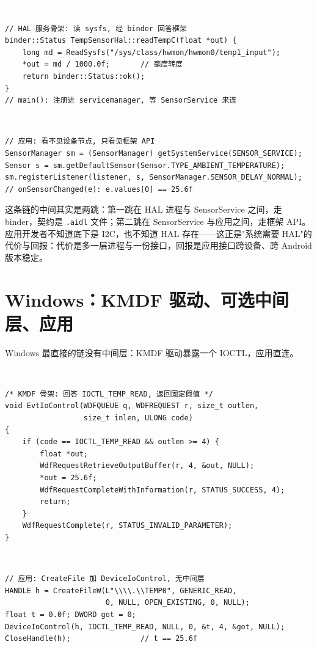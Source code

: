\documentclass[12pt,a4paper,fontset=fandol]{ctexbook}
\newcommand{\clabel}{%
  \begin{tcolorbox}[enhanced,colback=cheadbg,colframe=cheadbg,
    arc=1mm,boxrule=0mm,left=6pt,right=6pt,top=2pt,bottom=2pt,
    halign=left,oversize]
    \textcolor{white}{\small\bfseries C}
  \end{tcolorbox}\vspace{-4pt}}
\newcommand{\cpplabel}{%
  \begin{tcolorbox}[enhanced,colback=cppheadbg,colframe=cppheadbg,
    arc=1mm,boxrule=0mm,left=6pt,right=6pt,top=2pt,bottom=2pt,
    halign=left,oversize]
    \textcolor{white}{\small\bfseries C++}
  \end{tcolorbox}\vspace{-4pt}}
\newcommand{\javalabel}{%
  \begin{tcolorbox}[enhanced,colback=javaheadbg,colframe=javaheadbg,
    arc=1mm,boxrule=0mm,left=6pt,right=6pt,top=2pt,bottom=2pt,
    halign=left,oversize]
    \textcolor{white}{\small\bfseries Java}
  \end{tcolorbox}\vspace{-4pt}}
\begin{document}
\cpplabel
\begin{lstlisting}[style=cppstyle]
// HAL 服务骨架: 读 sysfs, 经 binder 回答框架
binder::Status TempSensorHal::readTempC(float *out) {
    long md = ReadSysfs("/sys/class/hwmon/hwmon0/temp1_input");
    *out = md / 1000.0f;       // 毫度转度
    return binder::Status::ok();
}
// main(): 注册进 servicemanager, 等 SensorService 来连
\end{lstlisting}

\javalabel
\begin{lstlisting}[style=javastyle]
// 应用: 看不见设备节点, 只看见框架 API
SensorManager sm = (SensorManager) getSystemService(SENSOR_SERVICE);
Sensor s = sm.getDefaultSensor(Sensor.TYPE_AMBIENT_TEMPERATURE);
sm.registerListener(listener, s, SensorManager.SENSOR_DELAY_NORMAL);
// onSensorChanged(e): e.values[0] == 25.6f
\end{lstlisting}

这条链的中间其实是两跳：第一跳在 HAL 进程与 SensorService 之间，走 binder，契约是 \texttt{.aidl} 文件；第二跳在 SensorService 与应用之间，走框架 API。应用开发者不知道底下是 I2C，也不知道 HAL 存在——这正是"系统需要 HAL"的代价与回报：代价是多一层进程与一份接口，回报是应用接口跨设备、跨 Android 版本稳定。

\section{Windows：KMDF 驱动、可选中间层、应用}

Windows 最直接的链没有中间层：KMDF 驱动暴露一个 IOCTL，应用直连。

\clabel
\begin{lstlisting}[style=cstyle]
/* KMDF 骨架: 回答 IOCTL_TEMP_READ, 返回固定假值 */
void EvtIoControl(WDFQUEUE q, WDFREQUEST r, size_t outlen,
                  size_t inlen, ULONG code)
{
    if (code == IOCTL_TEMP_READ && outlen >= 4) {
        float *out;
        WdfRequestRetrieveOutputBuffer(r, 4, &out, NULL);
        *out = 25.6f;
        WdfRequestCompleteWithInformation(r, STATUS_SUCCESS, 4);
        return;
    }
    WdfRequestComplete(r, STATUS_INVALID_PARAMETER);
}
\end{lstlisting}

\cpplabel
\begin{lstlisting}[style=cppstyle]
// 应用: CreateFile 加 DeviceIoControl, 无中间层
HANDLE h = CreateFileW(L"\\\\.\\TEMP0", GENERIC_READ,
                       0, NULL, OPEN_EXISTING, 0, NULL);
float t = 0.0f; DWORD got = 0;
DeviceIoControl(h, IOCTL_TEMP_READ, NULL, 0, &t, 4, &got, NULL);
CloseHandle(h);                // t == 25.6f
\end{lstlisting}
\end{document}
